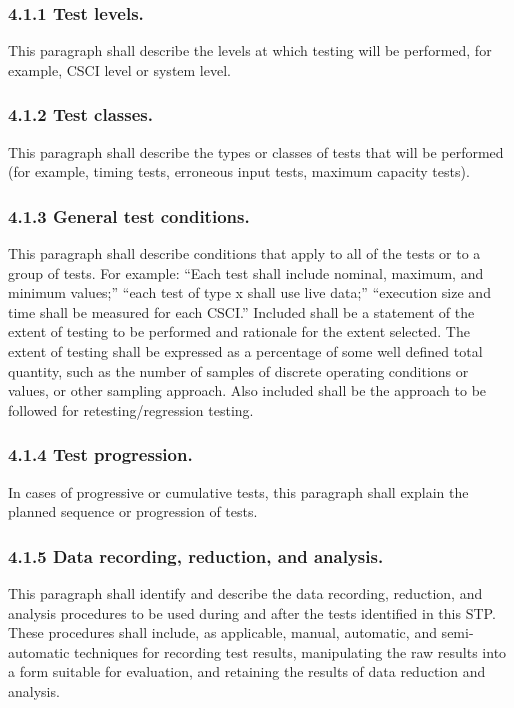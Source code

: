 \subsubsection{4.1.1 Test levels.}

This paragraph shall describe the levels at which testing will be
performed, for example, CSCI level or system level.

\subsubsection{4.1.2 Test classes.}

This paragraph shall describe the types or classes of tests that will be
performed (for example, timing tests, erroneous input tests, maximum
capacity tests).

\subsubsection{4.1.3 General test conditions.}

This paragraph shall describe conditions that apply to all of the tests
or to a group of tests. For example: ``Each test shall include nominal,
maximum, and minimum values;'' ``each test of type x shall use live
data;'' ``execution size and time shall be measured for each CSCI.''
Included shall be a statement of the extent of testing to be performed
and rationale for the extent selected. The extent of testing shall be
expressed as a percentage of some well defined total quantity, such as
the number of samples of discrete operating conditions or values, or
other sampling approach. Also included shall be the approach to be
followed for retesting/regression testing.

\subsubsection{4.1.4 Test progression.}

In cases of progressive or cumulative tests, this paragraph shall
explain the planned sequence or progression of tests.

\subsubsection{4.1.5 Data recording, reduction, and analysis.}

This paragraph shall identify and describe the data recording,
reduction, and analysis procedures to be used during and after the tests
identified in this STP. These procedures shall include, as applicable,
manual, automatic, and semi-automatic techniques for recording test
results, manipulating the raw results into a form suitable for
evaluation, and retaining the results of data reduction and analysis.

